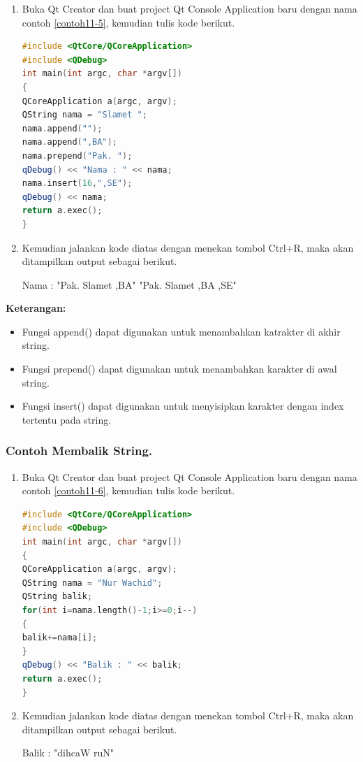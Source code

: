 \begin{enumerate}

\item
  Buka Qt Creator dan buat project Qt Console Application baru dengan
  nama contoh \ref{contoh11-5}, kemudian tulis kode berikut.

\begin{lstlisting}[language=c++, caption= Menggabungkan String, label=contoh11-5]
#include <QtCore/QCoreApplication>
#include <QDebug>
int main(int argc, char *argv[])
{
QCoreApplication a(argc, argv);
QString nama = "Slamet ";
nama.append("");
nama.append(",BA");
nama.prepend("Pak. ");
qDebug() << "Nama : " << nama;
nama.insert(16,",SE");
qDebug() << nama;
return a.exec();
}
\end{lstlisting}
\item
  Kemudian jalankan kode diatas dengan menekan tombol Ctrl+R, maka akan
  ditampilkan output sebagai berikut.
  
  \begin{lcverbatim}
  Nama :  "Pak. Slamet ,BA"
"Pak. Slamet ,BA ,SE"
  \end{lcverbatim}
\end{enumerate}

\textbf{Keterangan:}

\begin{itemize}

\item
  Fungsi append() dapat digunakan untuk menambahkan katrakter di akhir
  string.
\item
  Fungsi prepend() dapat digunakan untuk menambahkan karakter di awal
  string.
\item
  Fungsi insert() dapat digunakan untuk menyisipkan karakter dengan
  index tertentu pada string.
\end{itemize}

\subsubsection*{Contoh  Membalik String.}

\begin{enumerate}

\item
  Buka Qt Creator dan buat project Qt Console Application baru dengan
  nama contoh \ref{contoh11-6}, kemudian tulis kode berikut.

\begin{lstlisting}[language=c++, caption= Membalik String, label=contoh11-6]
#include <QtCore/QCoreApplication>
#include <QDebug>
int main(int argc, char *argv[])
{
QCoreApplication a(argc, argv);
QString nama = "Nur Wachid";
QString balik;
for(int i=nama.length()-1;i>=0;i--)
{
balik+=nama[i];
}
qDebug() << "Balik : " << balik;
return a.exec();
}
\end{lstlisting}
\item
  Kemudian jalankan kode diatas dengan menekan tombol Ctrl+R, maka akan
  ditampilkan output sebagai berikut.

  \begin{lcverbatim}
  Balik :  "dihcaW ruN"
  \end{lcverbatim}
\end{enumerate}

